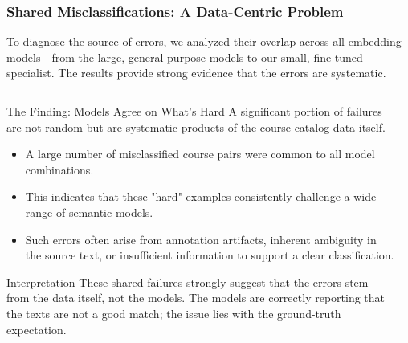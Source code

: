 \documentclass[aspectratio=169,10pt]{beamer}
\begin{document}
\begin{frame}
    \frametitle{Shared Misclassifications: A Data-Centric Problem}
    
    To diagnose the source of errors, we analyzed their overlap across all embedding models—from the large, general-purpose models to our small, fine-tuned specialist. The results provide strong evidence that the errors are systematic.

    \fontsize{9}{9}\selectfont
    \begin{columns}[T]
        \begin{column}{0.5\textwidth}
            \begin{block}{The Finding: Models Agree on What's Hard}
                A significant portion of failures are not random but are systematic products of the course catalog data itself.
                \begin{itemize}
                    \item A large number of misclassified course pairs were common to all model combinations.
                    \item This indicates that these "hard" examples consistently challenge a wide range of semantic models.
                    \item Such errors often arise from annotation artifacts, inherent ambiguity in the source text, or insufficient information to support a clear classification.
                \end{itemize}
            \end{block}

            \begin{alertblock}{Interpretation}
               These shared failures strongly suggest that the errors stem from the data itself, not the models. The models are correctly reporting that the texts are not a good match; the issue lies with the ground-truth expectation.
            \end{alertblock}
        \end{column}
        
        \begin{column}{0.45\textwidth}
            

\end{column}
\end{columns}
\end{frame}
\end{document}

